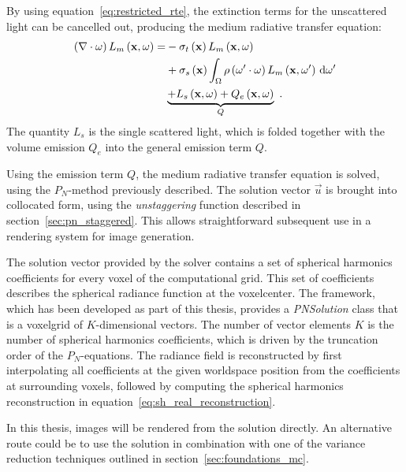 By using equation~\ref{eq:restricted_rte}, the extinction terms for the unscattered light can be cancelled out, producing the medium radiative transfer equation:
\begin{align}
\left(\nabla\cdot\omega\right)L_m\left(\mathbf{x}, \omega \right)
=&
-\sigma_t\left(\mathbf{x}\right) L_m\left(\mathbf{x}, \omega \right)\nonumber\\
&
+\sigma_s\left(\mathbf{x}\right) \int_{\Omega}
{
\rho\left(\omega'\cdot\omega\right)L_m\left(\mathbf{x}, \omega' \right)\,\mathrm{d}\omega'
}
\nonumber
\\
&
\underbrace
{
+L_s\left(\mathbf{x}, \omega\right)
+Q_e\left(\mathbf{x}, \omega\right)
}_{Q}
\nonumber
\  .
\end{align}
The quantity $L_s$ is the single scattered light, which is folded together with the volume emission $Q_e$ into the general emission term $Q$.

Using the emission term $Q$, the medium radiative transfer equation is solved, using the $P_N$-method previously described. The solution vector $\vec{u}$ is brought into collocated form, using the \emph{unstaggering} function described in section~\ref{sec:pn_staggered}. This allows straightforward subsequent use in a rendering system for image generation. 

The solution vector provided by the solver contains a set of spherical harmonics coefficients for every voxel of the computational grid. This set of coefficients describes the spherical radiance function at the voxelcenter. The framework, which has been developed as part of this thesis, provides a \emph{PNSolution} class that is a voxelgrid of $K$-dimensional vectors. The number of vector elements $K$ is the number of spherical harmonics coefficients, which is driven by the truncation order of the $P_N$-equations. The radiance field is reconstructed by first interpolating all coefficients at the given worldspace position from the coefficients at surrounding voxels, followed by computing the spherical harmonics reconstruction in equation~\ref{eq:sh_real_reconstruction}.

In this thesis, images will be rendered from the solution directly. An alternative route could be to use the solution in combination with one of the variance reduction techniques outlined in section~\ref{sec:foundations_mc}.

